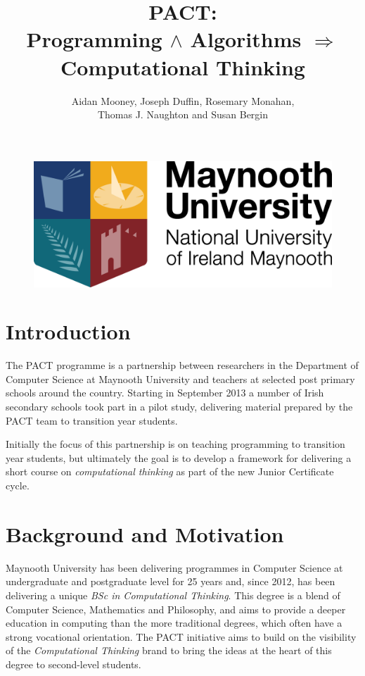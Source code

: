 \documentclass[a4paper]{article}
\begin{document}
\title{PACT: \\ {\large Programming ${\land}$ Algorithms $\Rightarrow$ Computational Thinking}}

\author{Aidan Mooney, Joseph Duffin, Rosemary Monahan, \\ Thomas J. Naughton and Susan Bergin}

\begin{figure}\centering
\includegraphics[height=.15\textheight]{logo2.png}
\end{figure}

\maketitle

\section{Introduction}
The PACT programme is a partnership between researchers in the Department of Computer Science at Maynooth University and teachers at selected post primary schools around the country.   Starting in September 2013 a number of Irish secondary schools took part in a pilot study, delivering material prepared by the PACT team to transition year students.

Initially the focus of this partnership is on teaching programming to transition year students, but ultimately the goal is to develop a framework for delivering a short course on \textit{computational thinking} as part of the new Junior Certificate cycle.


\section{Background and Motivation} \label{Background}

Maynooth University has been delivering programmes in Computer Science at undergraduate and postgraduate level for 25 years and, since 2012, has been delivering a unique \textit{BSc in Computational Thinking}.  This degree is a blend of Computer Science, Mathematics and Philosophy, and aims to provide a deeper education in computing than the more traditional degrees, which often have a strong vocational orientation.  The PACT initiative aims to build on the visibility of the \textit{Computational Thinking} brand to bring the ideas at the heart of this degree to second-level students.
\end{document}
